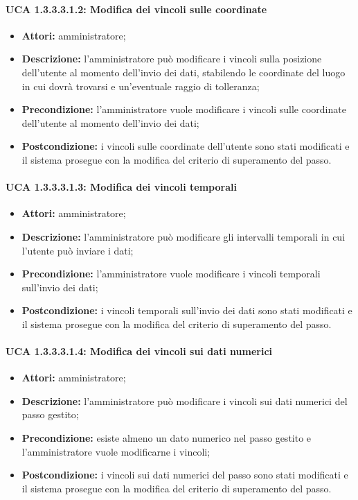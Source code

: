 \paragraph{UCA 1.3.3.3.1.2: Modifica dei vincoli sulle coordinate}
\begin{itemize}
\item \textbf{Attori:} 
amministratore;
\item \textbf{Descrizione:} 
l'amministratore può modificare i vincoli sulla posizione dell'utente al momento dell'invio dei dati, stabilendo le coordinate del luogo in cui dovrà trovarsi e un'eventuale raggio di tolleranza;
\item \textbf{Precondizione:} 
l'amministratore vuole modificare i vincoli sulle coordinate dell'utente al momento dell'invio dei dati;
\item \textbf{Postcondizione:}
i vincoli sulle coordinate dell'utente sono stati modificati e il sistema prosegue con la modifica del criterio di superamento del passo.
\end{itemize}

\paragraph{UCA 1.3.3.3.1.3: Modifica dei vincoli temporali}
\begin{itemize}
\item \textbf{Attori:} 
amministratore;
\item \textbf{Descrizione:} 
l'amministratore può modificare gli intervalli temporali in cui l'utente può inviare i dati;
\item \textbf{Precondizione:} 
l'amministratore vuole modificare i vincoli temporali sull'invio dei dati;
\item \textbf{Postcondizione:}
i vincoli temporali sull'invio dei dati sono stati modificati e il sistema prosegue con la modifica del criterio di superamento del passo.
\end{itemize}

\paragraph{UCA 1.3.3.3.1.4: Modifica dei vincoli sui dati numerici}
\begin{itemize}
\item \textbf{Attori:} 
amministratore;
\item \textbf{Descrizione:} 
l'amministratore può modificare i vincoli sui dati numerici del passo gestito;
\item \textbf{Precondizione:} 
esiste almeno un dato numerico nel passo gestito e l'amministratore vuole modificarne i vincoli;
\item \textbf{Postcondizione:}
i vincoli sui dati numerici del passo sono stati modificati e il sistema prosegue con la modifica del criterio di superamento del passo.
\end{itemize}

